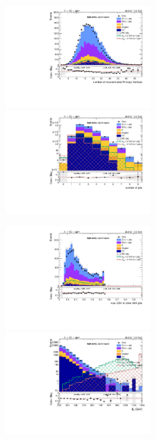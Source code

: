 \begin{figure}[!htb]
  \begin{center}  
    \includegraphics[width=0.495\textwidth]{plots/v9_thesis/XVZnnhpSR/nPV.pdf}
    \includegraphics[width=0.495\textwidth]{plots/v9_thesis/XVZnnhpSR/nJets.pdf}

    \includegraphics[width=0.495\textwidth]{plots/v9_thesis/XVZnnhpSR/MaxJetBTag.pdf}
    \includegraphics[width=0.495\textwidth]{plots/v9_thesis/XVZnnhpSR/MEt_pt.pdf}


\end{center}
\end{figure}
